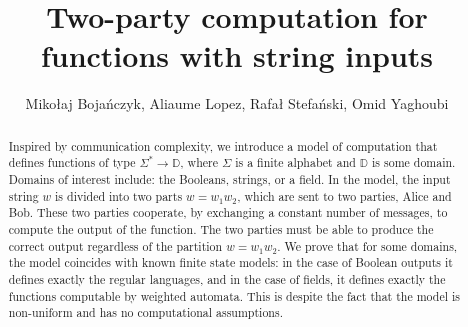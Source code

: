 \documentclass[11pt]{article}
\newcommand{\domain}{\mathbb D}
\begin{document}
\title{Two-party computation for functions with string inputs}
\author{Miko{\l}aj Boja\'nczyk, Aliaume Lopez, Rafa{\l} Stefa\'nski, Omid Yaghoubi }

\maketitle 
\begin{abstract}
 Inspired by communication complexity, we introduce a model of computation that defines functions of type $\Sigma^* \to \domain$, where $\Sigma$ is a finite alphabet and $\domain$ is some domain. Domains of interest include: the Booleans, strings, or a field. In the model, the input string $w$ is divided into two parts $w=w_1 w_2$, which are sent to two parties, Alice and Bob. These two parties cooperate, by exchanging a constant number of messages, to compute the output of the function. The two parties must be able to produce the correct output regardless of the partition $w = w_1 w_2$. We prove that for some domains, the model coincides with known finite state models: in the case of Boolean outputs it defines exactly the regular languages, and in the case of fields, it defines exactly the functions computable by weighted automata. This is despite the fact that the model is non-uniform and has no computational assumptions. 
\end{abstract}














\end{document}

